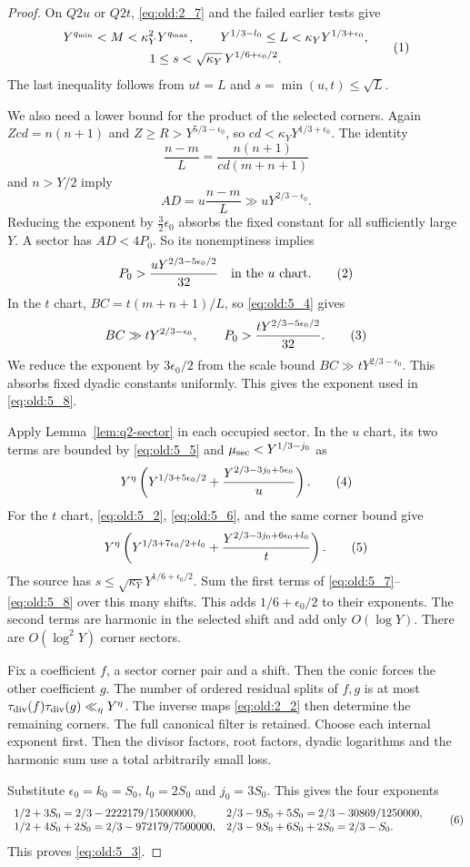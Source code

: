 \begin{proof}
On \(Q2u\) or \(Q2t\), \eqref{eq:old:2_7} and the failed earlier tests give
\[
\begin{gathered}
Y^{q_{\min}}<M<\kappa_Y^2Y^{q_{\max}},\qquad
Y^{1/3-l_0}\le L<\kappa_YY^{1/3+\epsilon_0},\\
1\le s<\sqrt{\kappa_Y}\,Y^{1/6+\epsilon_0/2}.
\end{gathered}\AutoTag{eq:old:5_4}
\]
The last inequality follows from \(ut=L\) and
\(s=\min(u,t)\le\sqrt L\).

We also need a lower bound for the product of the selected corners.
Again \(Zcd=n(n+1)\) and \(Z\ge R>Y^{5/3-\epsilon_0}\), so
\(cd<\kappa_Y Y^{1/3+\epsilon_0}\). The identity
\[
\frac{n-m}{L}=\frac{n(n+1)}{cd(m+n+1)}
\]
and \(n>Y/2\) imply
\[
AD=u\frac{n-m}{L}\gg uY^{2/3-\epsilon_0}.
\]
Reducing the exponent by \(\tfrac32\epsilon_0\) absorbs the fixed
constant for all sufficiently large \(Y\). A sector has
\(AD<4P_0\). So its nonemptiness implies
\[
P_0>\frac{uY^{2/3-5\epsilon_0/2}}{32}
\quad\text{in the \(u\) chart.}\AutoTag{eq:old:5_5}
\]
In the \(t\) chart, \(BC=t(m+n+1)/L\), so \eqref{eq:old:5_4} gives
\[
BC\gg tY^{2/3-\epsilon_0},\qquad
P_0>\frac{tY^{2/3-5\epsilon_0/2}}{32}.
\AutoTag{eq:old:5_6}
\]
We reduce the exponent by \(3\epsilon_0/2\) from the scale bound
\(BC\gg tY^{2/3-\epsilon_0}\). This absorbs fixed dyadic constants uniformly.
This gives the exponent used in \eqref{eq:old:5_8}.

Apply Lemma~\ref{lem:q2-sector} in each occupied sector. In the \(u\)
chart, its two terms are bounded by \eqref{eq:old:5_5} and
\(\mu_{\rm sec}<Y^{1/3-j_0}\) as
\[
Y^\eta\left(
Y^{1/3+5\epsilon_0/2}
+\frac{Y^{2/3-3j_0+5\epsilon_0}}u
\right).
\AutoTag{eq:old:5_7}
\]
For the \(t\) chart, \eqref{eq:old:5_2}, \eqref{eq:old:5_6}, and the same corner bound give
\[
Y^\eta\left(
Y^{1/3+7\epsilon_0/2+l_0}
+\frac{Y^{2/3-3j_0+6\epsilon_0+l_0}}t
\right).
\AutoTag{eq:old:5_8}
\]
The source has \(s\le\sqrt{\kappa_Y}Y^{1/6+\epsilon_0/2}\).
Sum the first terms of \eqref{eq:old:5_7}--\eqref{eq:old:5_8} over this many
shifts. This adds \(1/6+\epsilon_0/2\) to their exponents. The second terms are harmonic
in the selected shift and add only \(O(\log Y)\). There are
\(O(\log^2Y)\) corner sectors.

Fix a coefficient \(f\), a sector corner pair and a shift. Then the
conic forces the other coefficient \(g\). The number of ordered residual
splits of \(f,g\) is at most \(\tau_{\mathrm{div}}(f)\tau_{\mathrm{div}}(g)\ll_\eta Y^\eta\).
The inverse maps \eqref{eq:old:2_2} then determine the remaining corners. The full
canonical filter is retained. Choose each internal exponent first. Then
the divisor factors, root factors, dyadic logarithms and the harmonic sum
use a total arbitrarily small loss.

Substitute \(\epsilon_0=k_0=S_0\), \(l_0=2S_0\) and \(j_0=3S_0\).
This gives the four exponents
\[
\begin{array}{ll}
1/2+3S_0=2/3-2222179/15000000,&
2/3-9S_0+5S_0=2/3-30869/1250000,\\
1/2+4S_0+2S_0=2/3-972179/7500000,&
2/3-9S_0+6S_0+2S_0=2/3-S_0.
\end{array}
\AutoTag{eq:old:5_9}
\]
This proves \eqref{eq:old:5_3}.
\end{proof}
